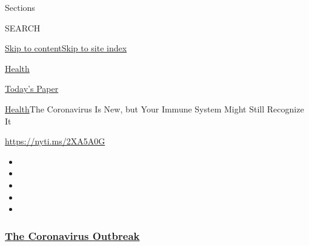 Sections

SEARCH

\protect\hyperlink{site-content}{Skip to
content}\protect\hyperlink{site-index}{Skip to site index}

\href{https://www.nytimes3xbfgragh.onion/section/health}{Health}

\href{https://myaccount.nytimes3xbfgragh.onion/auth/login?response_type=cookie\&client_id=vi}{}

\href{https://www.nytimes3xbfgragh.onion/section/todayspaper}{Today's
Paper}

\href{/section/health}{Health}\textbar{}The Coronavirus Is New, but Your
Immune System Might Still Recognize It

\url{https://nyti.ms/2XA5A0G}

\begin{itemize}
\item
\item
\item
\item
\item
\end{itemize}

\hypertarget{the-coronavirus-outbreak}{%
\subsubsection{\texorpdfstring{\href{https://www.nytimes3xbfgragh.onion/news-event/coronavirus?name=styln-coronavirus-national\&region=TOP_BANNER\&block=storyline_menu_recirc\&action=click\&pgtype=Article\&impression_id=a73ad0a0-f4bc-11ea-a147-e379c6aa6545\&variant=undefined}{The
Coronavirus
Outbreak}}{The Coronavirus Outbreak}}\label{the-coronavirus-outbreak}}

